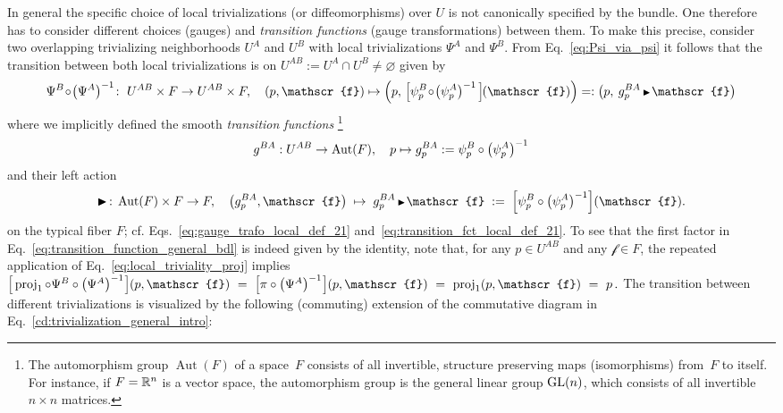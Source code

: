 In general the specific choice of local trivializations (or diffeomorphisms) over $U$ is not canonically specified by the bundle.
One therefore has to consider different choices (gauges) and \emph{transition functions} (gauge transformations) between them.
To make this precise, consider two overlapping trivializing neighborhoods $U^A$ and $U^B$ with local trivializations $\Psi^A$ and $\Psi^B$.
From Eq.~\eqref{eq:Psi_via_psi} it follows that the transition between both local trivializations is on $U^{AB}:=U^A\cap U^B\neq\varnothing$ given by
\begin{align}\label{eq:transition_function_general_bdl}
    \Psi^B\!\circ\!\big(\Psi^A\big)^{-1}\!:\ U^{AB}\times F \to U^{AB}\times F,
    \quad (p,\mathscr{f}) \mapsto \left(p,\, \pig[\psi_p^B \!\circ\! \big(\psi_p^A\big)^{-1}\, \pig]\mkern-1.5mu(\mathscr{f}) \right)
    =: \left(p,\: g_p^{BA} \,\btr\mkern1.5mu \mathscr{f}\right)
\end{align}
where we implicitly defined the smooth \emph{transition functions}%
\footnote{
    The automorphism group $\operatorname{Aut}(F)$ of a space~$F$ consists of all invertible, structure preserving maps (isomorphisms) from~$F$ to itself.
    For instance, if $F=\mathbb{R}^n$ is a vector space, the automorphism group is the general linear group $\operatorname{GL}(n)$, which consists of all invertible $n\!\times\!n$ matrices.
}
\begin{align}\label{eq:transition_functions_psi}
    g^{BA}: U^{AB} \to \operatorname{Aut}(F),\ \ \ p \mapsto g_p^{BA} := \psi_p^B \circ \big(\psi_p^A\big)^{-1}
\end{align}
and their left action
\begin{align}\label{eq:gauge_trafo_leftaction}
    \blacktriangleright\,:\, \Aut(F) \times F\to F, \quad
    \left(g_p^{BA}, \mathscr{f}\right) \;\mapsto\; g_p^{BA}\,\btr\mkern1.5mu \mathscr{f} \;:=\; \left[\psi_p^B\circ\big(\psi_p^A\big)^{-1}\right]\!(\mathscr{f}).
\end{align}
on the typical fiber $F$; cf. Eqs.~\eqref{eq:gauge_trafo_local_def_21} and~\eqref{eq:transition_fct_local_def_21}.
To see that the first factor in Eq.~\eqref{eq:transition_function_general_bdl} is indeed given by the identity, note that, for any $p\in U^{AB}$ and any $\mathscr{f}\in F$, the repeated application of Eq.~\eqref{eq:local_triviality_proj} implies
$
    \pig[ \proj_1 \circ \Psi^B \circ \big(\Psi^A\big)^{-1} \mkern1mu\pig] (p,\mathscr{f})
    \ =\ \pig[ \pi \circ \big(\Psi^A\big)^{-1}  \mkern1mu\pig] (p,\mathscr{f})
    \ =\ \proj_1 (p,\mathscr{f})
    \ =\ p \,.
$
The transition between different trivializations is visualized by the following (commuting) extension of the commutative diagram in Eq.~\eqref{cd:trivialization_general_intro}:
